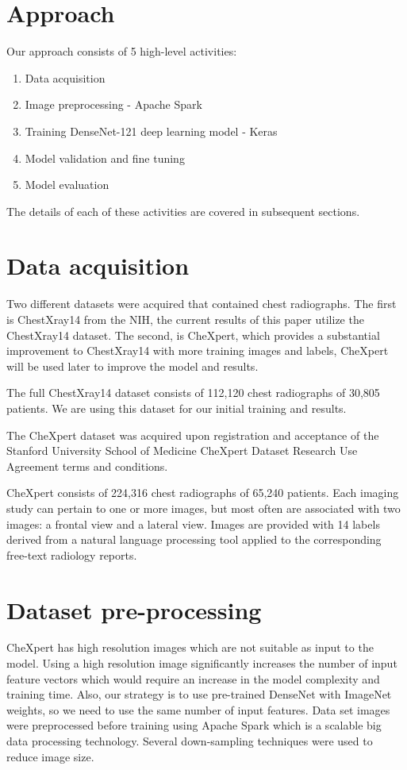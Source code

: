 \documentclass{amia}
\begin{document}
\section*{Approach}

Our approach consists of 5 high-level activities:
\begin{enumerate}
\item Data acquisition
\item Image preprocessing - Apache Spark
\item Training DenseNet-121 deep learning model - Keras
\item Model validation and fine tuning
\item Model evaluation
\end{enumerate}

The details of each of these activities are covered in subsequent sections.

\section*{Data acquisition}
Two different datasets were acquired that contained chest radiographs. The first is ChestXray14 from the NIH, the current results of this paper utilize the ChestXray14 dataset. The second, is CheXpert, which provides a substantial improvement to ChestXray14 with more training images and labels, CheXpert will be used later to improve the model and results.

The full ChestXray14 dataset consists of 112,120 chest radiographs of 30,805 patients. We are using this dataset for our initial training and results.

The CheXpert dataset was acquired upon registration and acceptance of the Stanford University School of Medicine CheXpert Dataset Research Use Agreement terms and conditions.\cite{ref2}

CheXpert consists of 224,316 chest radiographs of 65,240 patients. Each imaging study can pertain to one or more images, but most often are associated with two images: a frontal view and a lateral view. Images are provided with 14 labels derived from a natural language processing tool applied to the corresponding free-text radiology reports.


\section*{Dataset pre-processing}

CheXpert\cite{ref2} has high resolution images which are not suitable as input to the model. Using a high resolution image significantly increases the number of input feature vectors which would require an increase in the model complexity and training time. Also, our strategy is to use pre-trained DenseNet with ImageNet weights, so we need to use the same number of input features. Data set images were preprocessed before training using Apache Spark which is a scalable big data processing technology. Several down-sampling techniques were used to reduce image size.
\end{document}
